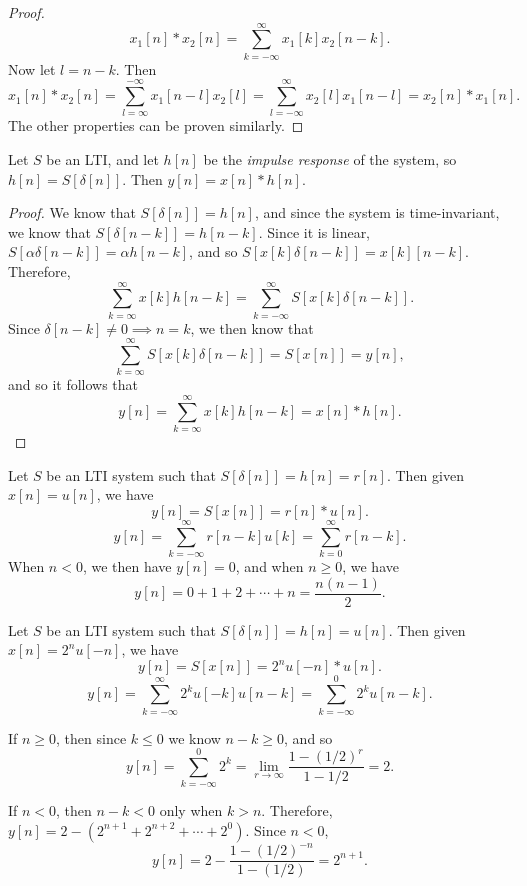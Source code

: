 \begin{proof}
    \[x_1[n]*x_2[n] = \sum_{k=-\infty}^{\infty}x_1[k]x_2[n-k].\] Now let $l = n-k$. Then \[x_1[n]*x_2[n] = \sum_{l=\infty}^{-\infty}x_1[n-l]x_2[l] = \sum_{l=-\infty}^{\infty}x_2[l]x_1[n-l] = x_2[n]*x_1[n].\] The other properties can be proven similarly.
\end{proof}

\begin{prop}
    Let $S$ be an LTI, and let $h[n]$ be the \emph{impulse response} of the system, so $h[n] = S[\delta[n]]$. Then $y[n] = x[n] * h[n]$.
\end{prop}

\begin{proof}
    We know that $S[\delta[n]] = h[n]$, and since the system is time-invariant, we know that $S[\delta[n - k]] = h[n - k]$. Since it is linear, $S[\alpha\delta[n - k]] =\alpha h[n-k]$, and so $S[x[k]\delta[n-k]] = x[k][n-k]$. Therefore, \[\sum_{k=\infty}^{\infty}x[k]h[n-k] = \sum_{k=-\infty}^{\infty}S[x[k]\delta[n-k]].\] Since $\delta[n-k] \neq 0 \implies n=k$, we then know that \[\sum_{k=\infty}^{\infty}S[x[k]\delta[n-k]] = S[x[n]] = y[n],\] and so it follows that
    \[y[n] = \sum_{k=\infty}^{\infty}x[k]h[n-k] = x[n]*h[n].\]
\end{proof}

\begin{exmp}
    Let $S$ be an LTI system such that $S[\delta[n]] = h[n] = r[n]$. Then given $x[n] = u[n]$, we have \[y[n] = S[x[n]] = r[n]*u[n].\]
    \[y[n] = \sum_{k=-\infty}^{\infty}r[n-k]u[k] = \sum_{k=0}^{\infty}r[n-k].\] When $n < 0$, we then have $y[n] = 0$, and when $n \geq 0$, we have \[y[n] = 0 + 1 + 2 + \cdots + n = \frac{n(n-1)}{2}.\]
\end{exmp}

\begin{exmp}
    Let $S$ be an LTI system such that $S[\delta[n]] = h[n] = u[n]$. Then given $x[n] = 2^{n}u[-n]$, we have \[y[n] = S[x[n]] = 2^{n}u[-n]*u[n].\]
    \[y[n] = \sum_{k=-\infty}^{\infty}2^{k}u[-k]u[n-k] = \sum_{k=-\infty}^{0}2^{k}u[n-k].\]

    If $n \geq 0$, then since $k \leq 0$ we know $n - k \geq 0$, and so
    \[y[n] = \sum_{k=-\infty}^{0}2^k = \lim_{r\to\infty}\frac{1-(1/2)^{r}}{1-1/2} = 2.\]

    If $n < 0$, then $n-k < 0$ only when $k > n$. Therefore, $y[n] = 2 - \left(2^{n+1} + 2^{n+2} + \cdots + 2^0\right)$. Since $n < 0$, \[y[n] = 2 - \frac{1-(1/2)^{-n}}{1-(1/2)} = 2^{n+1}.\]
\end{exmp}

